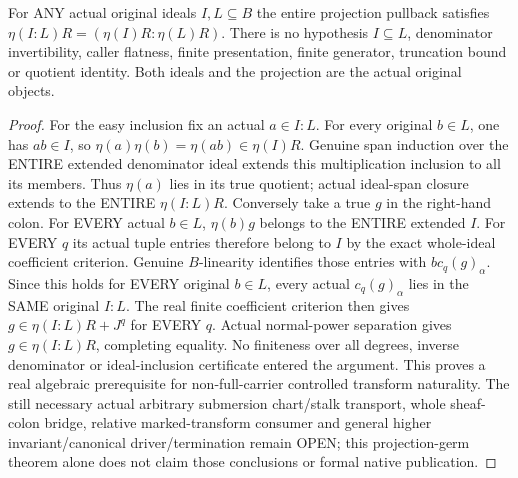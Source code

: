\begin{theorem}
\label{hir:submersion-projection-colon-entire-equality}
\leanok
{}
For ANY actual original ideals $I,L\subseteq B$ the entire projection
pullback satisfies $\eta(I:L)R=(\eta(I)R:\eta(L)R)$.
There is no hypothesis $I\subseteq L$, denominator invertibility, caller
flatness, finite presentation, finite generator, truncation bound or quotient
identity. Both ideals and the projection are the actual original objects.
\end{theorem}
\begin{proof}
For the easy inclusion fix an actual $a\in I:L$. For every original
$b\in L$, one has $ab\in I$, so
$\eta(a)\eta(b)=\eta(ab)\in\eta(I)R$. Genuine span induction over the
ENTIRE extended denominator ideal extends this multiplication inclusion to
all its members. Thus $\eta(a)$ lies in its true quotient; actual ideal-span
closure extends to the ENTIRE $\eta(I:L)R$.
Conversely take a true $g$ in the right-hand colon. For EVERY actual $b\in L$,
$\eta(b)g$ belongs to the ENTIRE extended $I$. For EVERY $q$ its actual tuple
entries therefore belong to $I$ by the exact whole-ideal coefficient
criterion. Genuine $B$-linearity identifies those entries with
$b c_q(g)_\alpha$. Since this holds for EVERY original $b\in L$, every
actual $c_q(g)_\alpha$ lies in the SAME original $I:L$. The real finite
coefficient criterion then gives $g\in\eta(I:L)R+J^q$ for EVERY $q$.
Actual normal-power separation gives $g\in\eta(I:L)R$, completing equality.
No finiteness over all degrees, inverse denominator or ideal-inclusion
certificate entered the argument. This proves a real algebraic prerequisite
for non-full-carrier controlled transform naturality. The still necessary
actual arbitrary submersion chart/stalk transport, whole sheaf-colon bridge,
relative marked-transform consumer and general higher invariant/canonical
driver/termination remain OPEN; this projection-germ theorem alone does not
claim those conclusions or formal native publication.
\end{proof}
